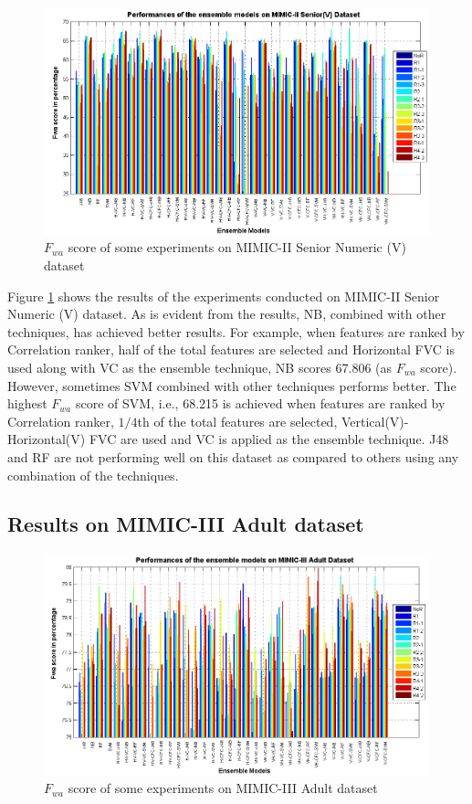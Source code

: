 \begin{figure}[h] 
	\centering 
	\includegraphics[scale=0.6]{fig/mimic2-seniork1v-full-table.png}
	\caption{$F_{wa}$ score of some experiments on MIMIC-II Senior Numeric (V) dataset}
	\label{F:MIMIC2_SeniorK1V_Table}	
\end{figure} 

Figure \ref{F:MIMIC2_SeniorK1V_Table} shows the results of the experiments conducted on MIMIC-II Senior Numeric (V) dataset. As is evident from the results, NB, combined with other techniques, has achieved better results. For example, when features are ranked by Correlation ranker, half of the total features are selected and Horizontal FVC is used along with VC as the ensemble technique, NB scores 67.806 (as $F_{wa}$ score). However, sometimes SVM combined with other techniques performs better. The highest $F_{wa}$ score of SVM, i.e., 68.215 is achieved when features are ranked by Correlation ranker, ${1/4}$th of the total features are selected, Vertical(V)-Horizontal(V) FVC are used and VC is applied as the ensemble technique. J48 and RF are not performing well on this dataset as compared to others using any combination of the techniques.
 
\subsection{Results on MIMIC-III Adult dataset}
\begin{figure}[h] 
	\centering
	\includegraphics[scale=0.6]{fig/mimic3-adult24hrs-full-table.png}
	\caption{$F_{wa}$ score of some experiments on MIMIC-III Adult dataset}
	\label{F:MIMIC3_Adult24hrs_Table}
\end{figure} 

